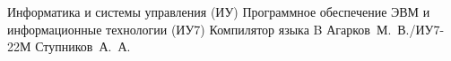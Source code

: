 \makecourseworktitle
{Информатика и системы управления (ИУ)}
{Программное обеспечение ЭВМ и информационные технологии (ИУ7)}
{Компилятор языка B}
{Агарков~М.~В./ИУ7-22М}
{Ступников~А.~А.}
{}
{}